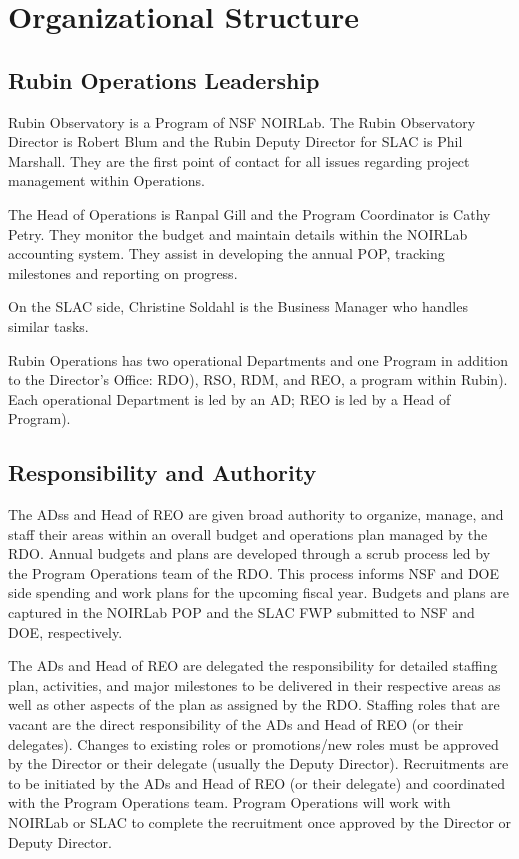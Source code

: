 \section{Organizational Structure}
\label{sec:structure}

\subsection{Rubin \gls{Operations} Leadership}
\label{sec:contacts}

Rubin Observatory is a Program of \gls{NSF} \gls{NOIRLab}.
The Rubin Observatory \gls{Director} is Robert Blum and the Rubin Deputy \gls{Director} for \gls{SLAC} is Phil Marshall.
They are the first point of contact for all issues regarding project management within \RO \gls{Operations}.

The Head of \gls{Operations} is Ranpal Gill and the Program Coordinator is Cathy Petry.
They monitor the budget and maintain details within the \gls{NOIRLab} accounting system.
They assist in developing the annual \gls{POP}, tracking milestones and reporting on progress.

On the \gls{SLAC} side, Christine Soldahl is the \gls{Business Manager} who handles similar tasks.

\gls{Rubin Operations} has two operational Departments and one Program in addition to the Director’s Office: \gls{RDO}), \gls{RSO}, \gls{RDM}, and \gls{REO}, a program within Rubin). Each operational Department is led by an \gls{AD}; REO is led by a Head of Program).

\subsection{Responsibility and Authority}
The \glspl{AD}s and Head of \gls{REO} are given broad authority to organize, manage, and staff their areas within an overall budget and operations plan  managed by the \gls{RDO}. Annual budgets and plans are developed through a scrub process led by the Program Operations team of the \gls{RDO}. This process informs \gls{NSF} and \gls{DOE} side spending and work plans for the upcoming fiscal year. Budgets and plans are captured in the NOIRLab \gls{POP} and the \gls{SLAC} \gls{FWP} submitted to \gls{NSF} and \gls{DOE}, respectively.

The \glspl{AD} and Head of \gls{REO} are delegated the responsibility for detailed staffing plan, activities, and major milestones to be delivered in their respective areas as well as other aspects of the plan as assigned by the \gls{RDO}. Staffing roles that are vacant are the direct responsibility of the \glspl{AD} and Head of \gls{REO} (or their delegates). Changes to existing roles or promotions/new roles must be approved by the Director or their delegate (usually the Deputy Director). Recruitments are to be initiated by the \glspl{AD} and Head of \gls{REO} (or their delegate) and coordinated with the Program Operations team. Program Operations will work with NOIRLab or SLAC to complete the recruitment once approved by the Director or Deputy Director.

